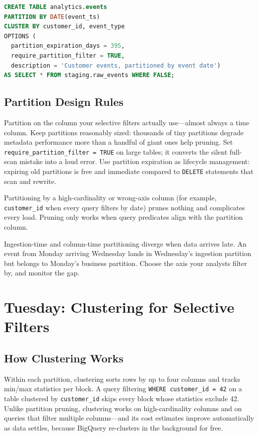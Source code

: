 \begin{lstlisting}[language=SQL,caption={Creating a daily time-partitioned, clustered table with an expiration.}]
CREATE TABLE analytics.events
PARTITION BY DATE(event_ts)
CLUSTER BY customer_id, event_type
OPTIONS (
  partition_expiration_days = 395,
  require_partition_filter = TRUE,
  description = 'Customer events, partitioned by event date')
AS SELECT * FROM staging.raw_events WHERE FALSE;
\end{lstlisting}

\subsection{Partition Design Rules}
Partition on the column your selective filters actually use---almost always a time column. Keep partitions reasonably sized: thousands of tiny partitions degrade metadata performance more than a handful of giant ones help pruning. Set \texttt{require\_partition\_filter = TRUE} on large tables; it converts the silent full-scan mistake into a loud error. Use partition expiration as lifecycle management: expiring old partitions is free and immediate compared to \texttt{DELETE} statements that scan and rewrite.

\begin{pitfall}
Partitioning by a high-cardinality or wrong-axis column (for example, \texttt{customer\_id} when every query filters by date) prunes nothing and complicates every load. Pruning only works when query predicates align with the partition column.
\end{pitfall}

\begin{notebox}
Ingestion-time and column-time partitioning diverge when data arrives late. An event from Monday arriving Wednesday lands in Wednesday's ingestion partition but belongs to Monday's business partition. Choose the axis your analysts filter by, and monitor the gap.
\end{notebox}

\section{Tuesday: Clustering for Selective Filters}

\subsection{How Clustering Works}
Within each partition, clustering sorts rows by up to four columns and tracks min/max statistics per block. A query filtering \texttt{WHERE customer\_id = 42} on a table clustered by \texttt{customer\_id} skips every block whose statistics exclude 42. Unlike partition pruning, clustering works on high-cardinality columns and on queries that filter multiple columns---and its cost estimates improve automatically as data settles, because BigQuery re-clusters in the background for free.

